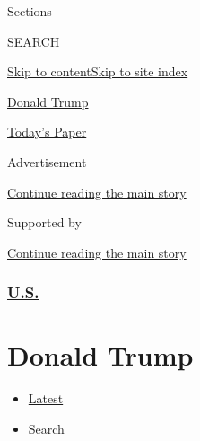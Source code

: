 Sections

SEARCH

\protect\hyperlink{site-content}{Skip to
content}\protect\hyperlink{site-index}{Skip to site index}

\href{https://www.nytimes3xbfgragh.onion/section/politics}{Donald Trump}

\href{https://myaccount.nytimes3xbfgragh.onion/auth/login?response_type=cookie\&client_id=vi}{}

\href{https://www.nytimes3xbfgragh.onion/section/todayspaper}{Today's
Paper}

Advertisement

\protect\hyperlink{after-top}{Continue reading the main story}

Supported by

\protect\hyperlink{after-sponsor}{Continue reading the main story}

\hypertarget{us}{%
\subsubsection{\texorpdfstring{\href{/section/us}{U.S.}}{U.S.}}\label{us}}

\hypertarget{donald-trump}{%
\section{Donald Trump}\label{donald-trump}}

\begin{itemize}
\tightlist
\item
  \protect\hyperlink{stream-panel}{Latest}
\item
  Search
\end{itemize}

